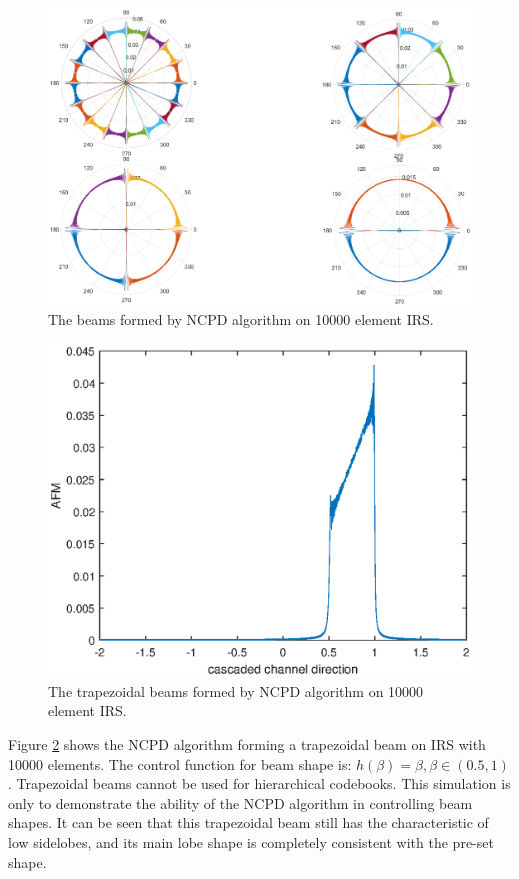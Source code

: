 \documentclass[12pt,draftclsnofoot,onecolumn]{IEEEtran}
\begin{document}
	
	\begin{figure}
		\centering
		\includegraphics[scale=0.5]{f3.eps}
		\caption{  The beams formed by NCPD algorithm on 10000 element IRS. } \label{f3}  
	\end{figure}
	
	
	
	\begin{figure}
		\centering
		\includegraphics[scale=0.45]{beamshape.eps}%
		\caption{ The trapezoidal beams formed by NCPD algorithm on 10000 element IRS.} \label{beamshape}  
	\end{figure}	
	

		Figure \ref{beamshape} shows the NCPD algorithm forming a trapezoidal beam on IRS with 10000 elements. The control function for beam shape is: $h(\beta)=\beta, \beta \in (0.5,1)$. Trapezoidal beams cannot be used for hierarchical codebooks. This simulation is only to demonstrate the ability of the NCPD algorithm in controlling beam shapes. It can be seen that this trapezoidal beam still has the characteristic of low sidelobes, and its main lobe shape is completely consistent with the pre-set shape.
	
\end{document}
